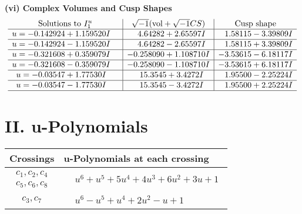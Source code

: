 \documentclass[1p]{elsarticle_modified}
\theoremstyle{definition}
\newcommand{\I}{\sqrt{-1}}
\begin{document}
\newpage\flushleft \textbf{(vi) Complex Volumes and Cusp Shapes}
$$\begin{array}{c|c|c}  
\text{Solutions to }I^u_{1}& \I (\text{vol} + \sqrt{-1}CS) & \text{Cusp shape}\\
 \hline 
\begin{aligned}
u &= -0.142924 + 1.159520 I\end{aligned}
 & \phantom{-}4.64282 + 2.65597 I & \phantom{-}1.58115 - 3.39809 I \\ \hline\begin{aligned}
u &= -0.142924 - 1.159520 I\end{aligned}
 & \phantom{-}4.64282 - 2.65597 I & \phantom{-}1.58115 + 3.39809 I \\ \hline\begin{aligned}
u &= -0.321608 + 0.359079 I\end{aligned}
 & -0.258090 + 1.108710 I & -3.53615 - 6.18117 I \\ \hline\begin{aligned}
u &= -0.321608 - 0.359079 I\end{aligned}
 & -0.258090 - 1.108710 I & -3.53615 + 6.18117 I \\ \hline\begin{aligned}
u &= -0.03547 + 1.77530 I\end{aligned}
 & \phantom{-}15.3545 + 3.4272 I & \phantom{-}1.95500 - 2.25224 I \\ \hline\begin{aligned}
u &= -0.03547 - 1.77530 I\end{aligned}
 & \phantom{-}15.3545 - 3.4272 I & \phantom{-}1.95500 + 2.25224 I\\
 \hline 
 \end{array}$$\newpage
\newpage\renewcommand{\arraystretch}{1}
\centering \section*{ II. u-Polynomials}
\begin{tabular}{m{50pt}|m{274pt}}
Crossings & \hspace{64pt}u-Polynomials at each crossing \\
\hline $$\begin{aligned}c_{1},c_{2},c_{4}\\c_{5},c_{6},c_{8}\end{aligned}$$&$\begin{aligned}
&u^6+u^5+5 u^4+4 u^3+6 u^2+3 u+1
\end{aligned}$\\
\hline $$\begin{aligned}c_{3},c_{7}\end{aligned}$$&$\begin{aligned}
&u^6- u^5+u^4+2 u^2- u+1
\end{aligned}$\\
\hline
\end{tabular}\newpage\renewcommand{\arraystretch}{1}
\end{document}
